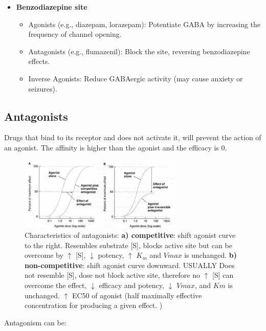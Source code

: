 \documentclass{book}
\begin{document}
\begin{itemize}
    \item \textbf{Benzodiazepine site}
    \begin{itemize}
        \item Agonists (e.g., diazepam, lorazepam): Potentiate GABA by increasing the frequency of channel opening.
        \item Antagonists (e.g., flumazenil): Block the site, reversing benzodiazepine effects.
        \item Inverse Agonists: Reduce GABAergic activity (may cause anxiety or seizures).
    \end{itemize}
\end{itemize}

\subsection{Antagonists}
Drugs that bind to its receptor and does not activate it, will prevent the action of an agonist.
The affinity is higher than the agonist and the efficacy is $0$.

\begin{figure}[H]
    \includegraphics[width=0.7\textwidth, center]{images/image21.png}
    \caption{Characteristics of antagonists: \textbf{a) competitive}: shift agonist curve to the right. Resembles substrate [S], blocks active site but can be overcome by $\uparrow$ [S], $\downarrow$ potency, $\uparrow$ $K_m$ and $Vmax$ is unchanged. \textbf{b) non-competitive}: shift agonist curve downward. USUALLY Does not resemble [S], dose not block active site, therefore no $\uparrow$ [S] can overcome the effect, $\downarrow$ efficacy and potency, $\downarrow$ $Vmax$, and $Km$ is unchanged. $\uparrow$ EC50 of agonist (half maximally effective concentration for producing a given effect. \cite{bulltes})
}
\end{figure}

Antagonism can be:
\end{document}
